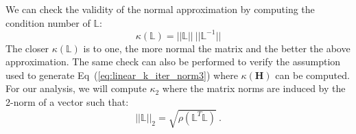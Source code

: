 \documentclass[letterpaper,12pt]{article}
\begin{document}
We can check the validity of the normal
approximation by computing the condition number of $\mathbb{L}$:
\begin{equation}
  \kappa(\mathbb{L}) = ||\mathbb{L}||\ ||\mathbb{L}^{-1}||
  \label{eq:operator_condition_number}
\end{equation}
The closer $\kappa(\mathbb{L})$ is to one, the more normal the matrix
and the better the above approximation. The same check can also be
performed to verify the assumption used to generate
Eq~(\ref{eq:linear_k_iter_norm3}) where $\kappa(\mathbf{H})$ can be
computed. For our analysis, we will compute $\kappa_2$ where the
matrix norms are induced by the 2-norm of a vector such that:
\begin{equation}
  ||\mathbb{L}||_2 = \sqrt{\rho(\mathbb{L}^T\mathbb{L})}\:.
  \label{eq:matrix_2_norm}
\end{equation}
\end{document}
